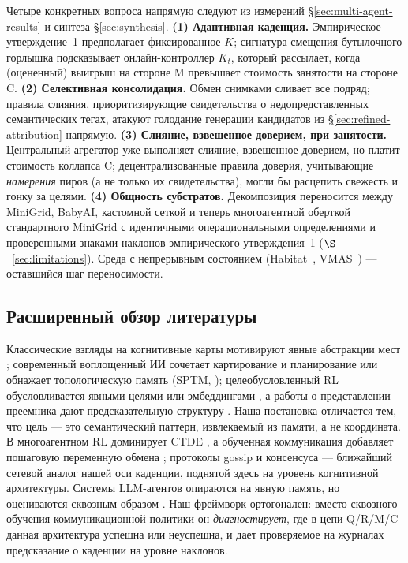 \documentclass{article}
\begin{document}
Четыре конкретных вопроса напрямую следуют из измерений \S\ref{sec:multi-agent-results} и синтеза \S\ref{sec:synthesis}.
\textbf{(1) Адаптивная каденция.} Эмпирическое утверждение~1 предполагает фиксированное $K$; сигнатура смещения бутылочного горлышка подсказывает онлайн-контроллер $K_t$, который рассылает, когда (оцененный) выигрыш на стороне M превышает стоимость занятости на стороне C.
\textbf{(2) Селективная консолидация.} Обмен снимками сливает все подряд; правила слияния, приоритизирующие свидетельства о недопредставленных семантических тегах, атакуют голодание генерации кандидатов из \S\ref{sec:refined-attribution} напрямую.
\textbf{(3) Слияние, взвешенное доверием, при занятости.} Центральный агрегатор уже выполняет слияние, взвешенное доверием, но платит стоимость коллапса C; децентрализованные правила доверия, учитывающие \emph{намерения} пиров (а не только их свидетельства), могли бы расцепить свежесть и гонку за целями.
\textbf{(4) Общность субстратов.} Декомпозиция переносится между MiniGrid, BabyAI, кастомной сеткой и теперь многоагентной оберткой стандартного MiniGrid с идентичными операциональными определениями и проверенными знаками наклонов эмпирического утверждения~1 ($\S$~\ref{sec:limitations}). Среда с непрерывным состоянием (Habitat~\citep{savva2019habitat}, VMAS~\citep{bettini2022vmas}) --- оставшийся шаг переносимости.

\subsection{Расширенный обзор литературы}
\label{app:related-work-extended}

Классические взгляды на когнитивные карты мотивируют явные абстракции мест \citep{tolman1948cognitive,okeefe1978hippocampus,kuipers2000spatial}; современный воплощенный ИИ сочетает картирование и планирование \citep{gupta2017cognitive} или обнажает топологическую память (SPTM, \citealp{savinov2018semi}); целеобусловленный RL обусловливается явными целями или эмбеддингами \citep{andrychowicz2017hindsight,ghosh2021learning}, а работы о представлении преемника дают предсказательную структуру \citep{dayan1993improving,stachenfeld2017hippocampus,momennejad2017successor}. Наша постановка отличается тем, что цель --- это семантический паттерн, извлекаемый из памяти, а не координата. В многоагентном RL доминирует CTDE \citep{lowe2017maddpg,foerster2018ctde}, а обученная коммуникация добавляет пошаговую переменную обмена \citep{sukhbaatar2016commnet,foerster2016learning}; протоколы gossip и консенсуса \citep{boyd2006gossip,xiao2007distributed} --- ближайший сетевой аналог нашей оси каденции, поднятой здесь на уровень когнитивной архитектуры. Системы LLM-агентов опираются на явную память, но оцениваются сквозным образом \citep{wang2023voyager,shinn2023reflexion,packer2023memgpt}. Наш фреймворк ортогонален: вместо сквозного обучения коммуникационной политики он \emph{диагностирует}, где в цепи Q/R/M/C данная архитектура успешна или неуспешна, и дает проверяемое на журналах предсказание о каденции на уровне наклонов.
\end{document}
